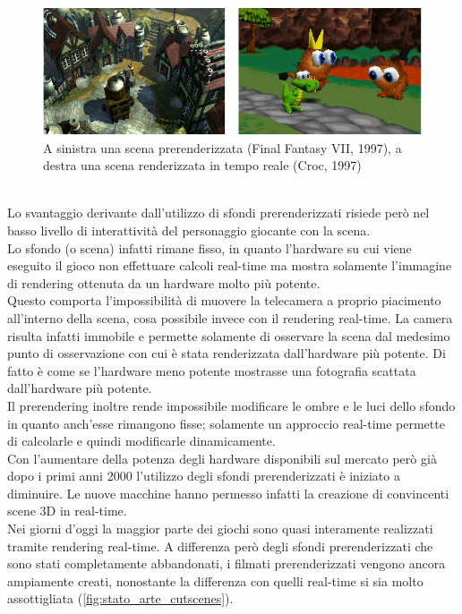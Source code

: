 \begin{figure}[htb]
 \centering
 \includegraphics[width=1\linewidth]{images/chapter_stato_arte/stato_arte_croc_ffvii.png}\hfill
 \caption[Confronto tra scena prerenderizzata e real time]{A sinistra una scena prerenderizzata (Final Fantasy VII, 1997), a destra una scena renderizzata in tempo reale (Croc, 1997)}
 \label{fig:stato_arte_confronto_ffvii_croc}
\end{figure}
\\
Lo svantaggio derivante dall’utilizzo di sfondi prerenderizzati risiede però nel basso livello di interattività del personaggio giocante con la scena.
\\
Lo sfondo (o scena) infatti rimane fisso, in quanto l’hardware su cui viene eseguito il gioco non effettuare calcoli real-time ma mostra solamente l’immagine di rendering ottenuta da un hardware molto più potente.
\\
Questo comporta l’impossibilità di muovere la telecamera a proprio piacimento all’interno della scena, cosa possibile invece con il rendering real-time. La camera risulta infatti immobile e permette solamente di osservare la scena dal medesimo punto di osservazione con cui è stata renderizzata dall’hardware più potente. Di fatto è come se l’hardware meno potente mostrasse una fotografia scattata dall’hardware più potente.
\\
Il prerendering inoltre rende impossibile modificare le ombre e le luci dello sfondo in quanto anch’esse rimangono fisse; solamente un approccio real-time permette di calcolarle e quindi modificarle dinamicamente.
\\
Con l’aumentare della potenza degli hardware disponibili sul mercato però già dopo i primi anni 2000 l’utilizzo degli sfondi prerenderizzati è iniziato a diminuire. Le nuove macchine hanno permesso infatti la creazione di convincenti scene 3D in real-time.
\\ 
Nei giorni d’oggi la maggior parte dei giochi sono quasi interamente realizzati tramite rendering real-time. A differenza però degli sfondi prerenderizzati che sono stati completamente abbandonati, i filmati prerenderizzati vengono ancora ampiamente creati, nonostante la differenza con quelli real-time si sia molto assottigliata (\ref{fig:stato_arte_cutscenes}).
